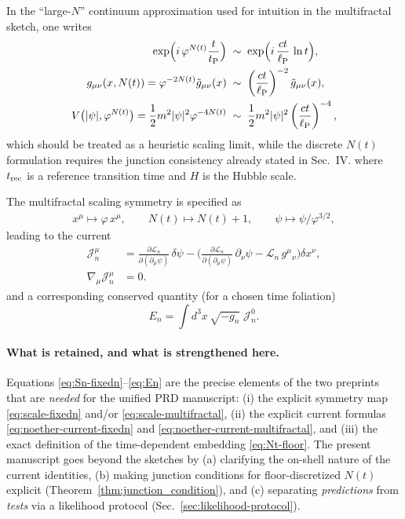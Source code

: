 \documentclass[
  reprint,
  amsmath,amssymb,
  aps,
  prd,
  superscriptaddress,
  nofootinbib,
  longbibliography
]{revtex4-2}
\newcommand{\phig}{\varphi}
\newcommand{\ellP}{\ell_{\rm P}}
\newcommand{\tP}{t_{\rm P}}
\theoremstyle{definition}
\theoremstyle{remark}
\begin{document}
In the ``large-$N$'' continuum approximation used for intuition in the multifractal sketch, one writes
\begin{align}
\exp\!\Big(i\,\phig^{N(t)}\frac{t}{\tP}\Big)&\;\sim\;\exp\!\Big(i\,\frac{ct}{\ellP}\,\ln t\Big),
\label{eq:phase-largeN-approx}
\\
g_{\mu\nu}(x,N(t))=\phig^{-2N(t)}\tilde g_{\mu\nu}(x)
&\;\sim\;\left(\frac{ct}{\ellP}\right)^{-2}\tilde g_{\mu\nu}(x),
\label{eq:metric-largeN-approx}
\\
V\big(|\psi|,\phig^{N(t)}\big)=\frac12 m^2|\psi|^2\phig^{-4N(t)}
&\;\sim\;\frac12 m^2|\psi|^2\left(\frac{ct}{\ellP}\right)^{-4},
\label{eq:V-largeN-approx}
\end{align}
which should be treated as a heuristic scaling limit, while the discrete $N(t)$ formulation requires the
junction consistency already stated in Sec.~IV.
where $t_{\rm rec}$ is a reference transition time and $H$ is the Hubble scale.

The multifractal scaling symmetry is specified as
\begin{equation}
\begin{split}
x^\mu \mapsto \phig\,x^\mu,\qquad
N(t)\mapsto N(t)+1,\qquad
\psi\mapsto \psi/\phig^{3/2},
\end{split}
\label{eq:scale-multifractal}
\end{equation}
leading to the current
\begin{align}
\mathcal{J}^\mu_{n}
&=\frac{\partial \mathcal{L}_{n}}{\partial(\partial_\mu\psi)}\,\delta\psi
-
\Big(
\frac{\partial \mathcal{L}_{n}}{\partial(\partial_\mu\psi)}\,\partial_\nu\psi
-
\mathcal{L}_{n}\,g^\mu{}_\nu
\Big)\delta x^\nu,
\nonumber\\
\nabla_\mu \mathcal{J}^\mu_{n}&=0.
\label{eq:noether-current-multifractal}
\end{align}
and a corresponding conserved quantity (for a chosen time foliation)
\begin{equation}
E_n=\int d^3x\,\sqrt{-g_n}\;\mathcal{J}^0_{n}.
\label{eq:En}
\end{equation}

\paragraph{What is retained, and what is strengthened here.}
Equations \eqref{eq:Sn-fixedn}--\eqref{eq:En} are the precise elements of the two preprints that are
\emph{needed} for the unified PRD manuscript: (i) the explicit symmetry map
\eqref{eq:scale-fixedn} and/or \eqref{eq:scale-multifractal}, (ii) the explicit current formulas
\eqref{eq:noether-current-fixedn} and \eqref{eq:noether-current-multifractal}, and (iii) the exact
definition of the time-dependent embedding \eqref{eq:Nt-floor}.
The present manuscript goes beyond the sketches by (a) clarifying the on-shell nature of the current
identities, (b) making junction conditions for floor-discretized $N(t)$ explicit (Theorem~\ref{thm:junction_condition}),
and (c) separating \emph{predictions} from \emph{tests} via a likelihood protocol (Sec.~\ref{sec:likelihood-protocol}).
\end{document}
